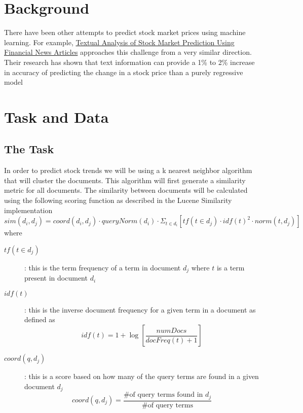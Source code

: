 \documentclass[11pt,letterpaper]{article}
\newcommand{\blue}[1]{\textcolor{RoyalBlue}{#1}}
\newcommand{\instructions}[1]{\blue{\textit{#1}}}
\begin{document}
\section{Background}
\label{sec:background}
There have been other attempts to predict stock market prices using machine
learning. For example, \href{http://ailab.arizona.edu/intranet/papers/Textual\%20Analysis\%20of\%20Stock\%20Market.pdf}{Textual Analysis of Stock Market Prediction Using Financial News Articles}
approaches this challenge from a very similar direction. Their research has
shown that text information can provide a 1\% to 2\% increase in accuracy of
predicting the change in a stock price than a purely regressive model ~\cite{arizona}

\section{Task and Data}
\label{sec:taskAndData}

\subsection{The Task}
\label{sec:task}
In order to predict stock trends we will be using a k nearest neighbor
algorithm that will cluster the documents. This algorithm will
first generate a similarity metric for all documents.
The similarity between documents will be calculated using the
following scoring function as described in the Lucene Similarity implementation ~\cite{similarity}
\begin{equation}\label{doc:sim}
	sim(d_i, d_j) = coord(d_i, d_j) \cdot queryNorm(d_i) \cdot \Sigma_{t \in d_i} \left[ tf(t \in d_j) \cdot idf(t)^2 \cdot norm(t,d_j) \right]
\end{equation}
where
\begin{description}
	\item[\(tf(t \in d_j)\)] : this is the term frequency of a term in document \(d_j\) where \(t\) is a term present in document \(d_i\)
	\item[\(idf(t)\)] : this is the inverse document frequency for a given term in a document as defined as
	\begin{equation}\label{doc:idf}
		idf(t) = 1 + \log \left[ \frac{numDocs}{docFreq(t) + 1} \right]
	\end{equation}
	\item[\(coord(q,d_j)\)] : this is a score based on how many of the query terms are found in a given document \(d_j\)
	\begin{equation}\label{doc:coord}
		coord(q,d_j) = \frac{\text{\# of query terms found in } d_j }{\text{\# of query terms}}
	\end{equation}
\end{description}
\end{document}
